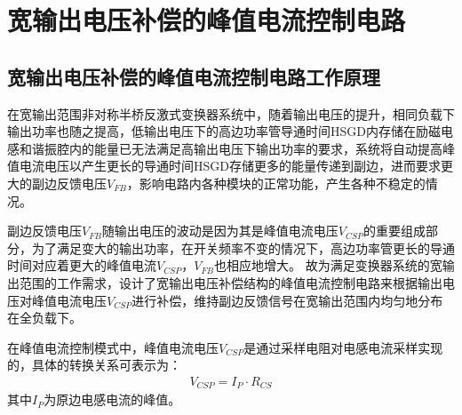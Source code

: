 


\section{宽输出电压补偿的峰值电流控制电路}
\label{sec:峰值电流控制电路}
\subsection{宽输出电压补偿的峰值电流控制电路工作原理}

在宽输出范围非对称半桥反激式变换器系统中，随着输出电压的提升，相同负载下输出功率也随之提高，低输出电压下的高边功率管导通时间HSGD内存储在励磁电感和谐振腔内的能量已无法满足高输出电压下输出功率的要求，系统将自动提高峰值电流电压以产生更长的导通时间HSGD存储更多的能量传递到副边，进而要求更大的副边反馈电压$V_{FB}$，影响电路内各种模块的正常功能，产生各种不稳定的情况。

副边反馈电压$V_{FB}$随输出电压的波动是因为其是峰值电流电压$V_{CSP}$的重要组成部分，为了满足变大的输出功率，在开关频率不变的情况下，高边功率管更长的导通时间对应着更大的峰值电流$V_{CSP}$，$V_{FB}$也相应地增大。
故为满足变换器系统的宽输出范围的工作需求，设计了宽输出电压补偿结构的峰值电流控制电路来根据输出电压对峰值电流电压$V_{CSP}$进行补偿，维持副边反馈信号在宽输出范围内均匀地分布在全负载下。


在峰值电流控制模式中，峰值电流电压$V_{CSP}$是通过采样电阻对电感电流采样实现的，具体的转换关系可表示为：
\begin{align}
    \label{eq:VCSP公式}
    V_{CSP} = I_P \cdot R_{CS} 
\end{align}
其中$I_P$为原边电感电流的峰值。

